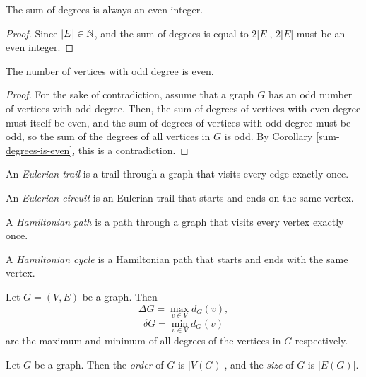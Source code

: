 \begin{cor}\label{sum-degrees-is-even}
    The sum of degrees is always an even integer.
\end{cor}

\begin{proof}
    Since $|E| \in \mathbb{N}$, and the sum of degrees is equal to $2|E|$, $2|E|$ must be an even integer.
\end{proof}

\begin{cor}\label{n-of-odd-vertices-is-even}
    The number of vertices with odd degree is even.
\end{cor}

\begin{proof}
    For the sake of contradiction, assume that a graph $G$ has an odd number of vertices with odd degree. Then, the sum of degrees of vertices with even degree must itself be even, and the sum of degrees of vertices with odd degree must be odd, so the sum of the degrees of all vertices in $G$ is odd. By Corollary \ref{sum-degrees-is-even}, this is a contradiction.
\end{proof}

\begin{defn}
    An \emph{Eulerian trail} is a trail through a graph that visits every edge exactly once.
\end{defn}

\begin{defn}
    An \emph{Eulerian circuit} is an Eulerian trail that starts and ends on the same vertex.
\end{defn}

\begin{defn}
    A \emph{Hamiltonian path} is a path through a graph that visits every vertex exactly once.
\end{defn}

\begin{defn}
    A \emph{Hamiltonian cycle} is a Hamiltonian path that starts and ends with the same vertex.
\end{defn}

\begin{defn}
    Let $G = (V, E)$ be a graph. Then
    \[\Delta G = \max_{v \in V}d_G(v),\]
    \[\delta G = \min_{v \in V}d_G(v)\] are the maximum and minimum of all degrees of the vertices in $G$ respectively.
\end{defn}

\begin{defn}
    Let $G$ be a graph. Then the \emph{order} of $G$ is $|V(G)|$, and the \emph{size} of $G$ is $|E(G)|$.
\end{defn}

